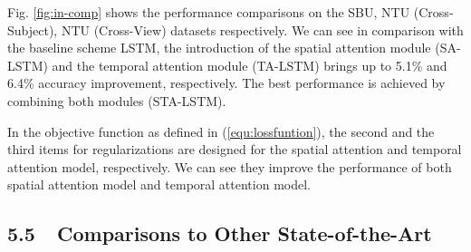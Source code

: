 \documentclass[letterpaper]{article}
\begin{document}
Fig. \ref{fig:in-comp} shows the performance comparisons on the SBU, NTU (Cross-Subject), NTU (Cross-View) datasets respectively. We can see in comparison with the baseline scheme LSTM, the introduction of the spatial attention module (SA-LSTM) and the temporal attention module (TA-LSTM) brings up to 5.1\% and 6.4\% accuracy improvement, respectively. The best performance is achieved by combining both modules (STA-LSTM).

In the objective function as defined in (\ref{equ:lossfuntion}), the second and the third items for regularizations are designed for the spatial attention and temporal attention model, respectively. We can see they improve the performance of both spatial attention model and temporal attention model.




\begin{comment}
\begin{table}[htbp]
\fontsize{8pt}{9pt}\selectfont\centering
\begin{center}
\caption{Accuracy(\%) comparisons for our spatial and temporal attention models on NTU dataset.} \label{table:In-comp}
\begin{tabular}{c|c|c|c}
\hline
Methods & SBU & Cross Subject) & Cross View \\
\hline
Baseline & 86.72 & 66.80 & 77.53\\
\hline
SA-LSTM & 88.00 & 71.89 & 80.35\\
\hline
TA-LSTM & 88.79 & 73.16 & 80.51\\
\hline
STA-LSTM & 91.51 & 73.42 & 81.23\\
\hline
\end{tabular}
\end{center}
\end{table}
\end{comment}



\subsection{5.5~~Comparisons to Other State-of-the-Art}
\end{document}
